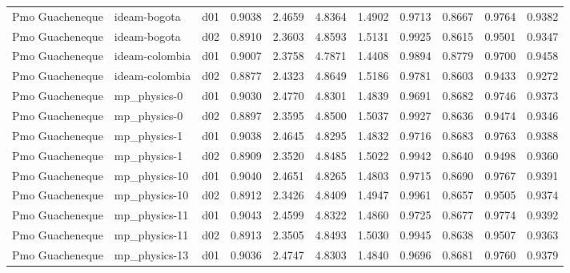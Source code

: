 \begin{longtable}{lllrrrrrrrr}
      Pmo Guacheneque  &          ideam-bogota &     d01 &   0.9038 &   2.4659 &   4.8364 &       1.4902 &        0.9713 &       0.8667 &           0.9764 &  0.9382 \\
      Pmo Guacheneque  &          ideam-bogota &     d02 &   0.8910 &   2.3603 &   4.8593 &       1.5131 &        0.9925 &       0.8615 &           0.9501 &  0.9347 \\
      Pmo Guacheneque  &        ideam-colombia &     d01 &   0.9007 &   2.3758 &   4.7871 &       1.4408 &        0.9894 &       0.8779 &           0.9700 &  0.9458 \\
      Pmo Guacheneque  &        ideam-colombia &     d02 &   0.8877 &   2.4323 &   4.8649 &       1.5186 &        0.9781 &       0.8603 &           0.9433 &  0.9272 \\
      Pmo Guacheneque  &          mp\_physics-0 &     d01 &   0.9030 &   2.4770 &   4.8301 &       1.4839 &        0.9691 &       0.8682 &           0.9746 &  0.9373 \\
      Pmo Guacheneque  &          mp\_physics-0 &     d02 &   0.8897 &   2.3595 &   4.8500 &       1.5037 &        0.9927 &       0.8636 &           0.9474 &  0.9346 \\
      Pmo Guacheneque  &          mp\_physics-1 &     d01 &   0.9038 &   2.4645 &   4.8295 &       1.4832 &        0.9716 &       0.8683 &           0.9763 &  0.9388 \\
      Pmo Guacheneque  &          mp\_physics-1 &     d02 &   0.8909 &   2.3520 &   4.8485 &       1.5022 &        0.9942 &       0.8640 &           0.9498 &  0.9360 \\
      Pmo Guacheneque  &         mp\_physics-10 &     d01 &   0.9040 &   2.4651 &   4.8265 &       1.4803 &        0.9715 &       0.8690 &           0.9767 &  0.9391 \\
      Pmo Guacheneque  &         mp\_physics-10 &     d02 &   0.8912 &   2.3426 &   4.8409 &       1.4947 &        0.9961 &       0.8657 &           0.9505 &  0.9374 \\
      Pmo Guacheneque  &         mp\_physics-11 &     d01 &   0.9043 &   2.4599 &   4.8322 &       1.4860 &        0.9725 &       0.8677 &           0.9774 &  0.9392 \\
      Pmo Guacheneque  &         mp\_physics-11 &     d02 &   0.8913 &   2.3505 &   4.8493 &       1.5030 &        0.9945 &       0.8638 &           0.9507 &  0.9363 \\
      Pmo Guacheneque  &         mp\_physics-13 &     d01 &   0.9036 &   2.4747 &   4.8303 &       1.4840 &        0.9696 &       0.8681 &           0.9760 &  0.9379 \\

\end{longtable}
